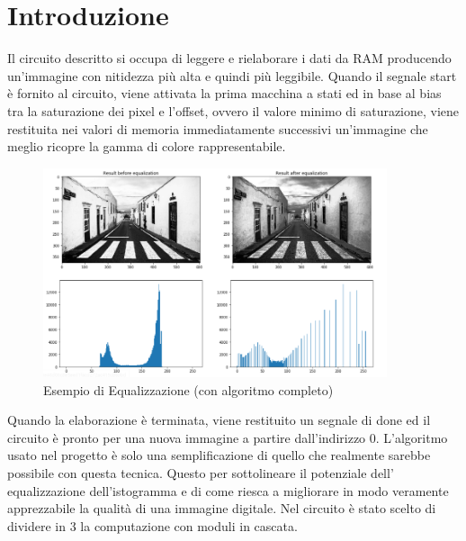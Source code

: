 \documentclass{article}
\begin{document}
\section{Introduzione}
\label{intro}
Il circuito descritto si occupa di leggere e rielaborare i dati da RAM producendo un'immagine con nitidezza più alta e quindi più leggibile. 
\newline
Quando il segnale start è fornito al circuito, viene attivata la prima macchina a stati ed in base al bias tra la saturazione dei pixel e l'offset, ovvero il valore minimo di saturazione, viene restituita nei valori di memoria immediatamente successivi un'immagine che meglio ricopre la gamma di colore rappresentabile.
\begin{figure}[h]
\centering
\includegraphics[width=0.9\textwidth]{Example.png}
\caption{Esempio di Equalizzazione (con algoritmo completo)}
\end{figure}
Quando la elaborazione è terminata, viene restituito un segnale di done ed il circuito è pronto per una nuova immagine a partire dall'indirizzo 0. L'algoritmo usato nel progetto è solo una semplificazione di quello che realmente sarebbe possibile con questa tecnica. 
\newline
Questo per sottolineare il potenziale dell' equalizzazione dell'istogramma e di come riesca a migliorare in modo veramente apprezzabile la qualità di una immagine digitale.
\newline
\break
Nel circuito è stato scelto di dividere in 3 la computazione con moduli in cascata.
\end{document}
